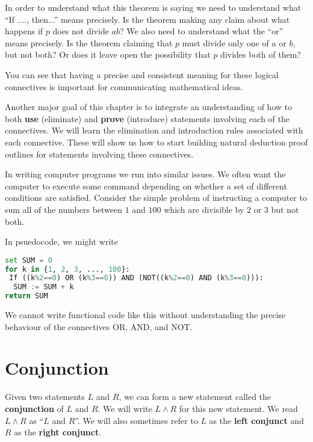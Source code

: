 In order to understand what this theorem is saying we need to understand what ``If ...., then...'' means precisely.  Is the theorem making any claim about what happens if $p$ does not divide $ab$?  We also need to understand what the ``or'' means precisely.  Is the theorem claiming that $p$ must divide only one of $a$ or $b$, but not both?  Or does it leave open the possibility that $p$ divides both of them?

You can see that having a precise and consistent meaning for these logical connectives is important for communicating mathematical ideas. 

Another major goal of this chapter is to integrate an understanding of how to both \textbf{use} (eliminate) and \textbf{prove} (introduce) statements involving each of the connectives.  We will learn the elimination and introduction rules associated with each connective.  These will show us how to start building natural deduction proof outlines for statements involving these connectives.

In writing computer programs we run into similar issues.  We often want the computer to execute some command depending on whether a set of different conditions are satisfied.  Consider the simple problem of instructing a computer to sum all of the numbers between $1$ and $100$ which are divisible by $2$ or $3$ but not both.

In psuedocode, we might write

\begin{lstlisting}[language=Python]
set SUM = 0
for k in {1, 2, 3, ..., 100}:
 If ((k%2==0) OR (k%3==0)) AND (NOT((k%2==0) AND (k%3==0))):
  SUM := SUM + k 
return SUM
\end{lstlisting}

We cannot write functional code like this without understanding the precise behaviour of the connectives OR, AND, and NOT.



\section{Conjunction}

Given two statements $L$ and $R$, we can form a new  statement called the \textbf{conjunction} of $L$ and $R$.  We will write $L \wedge R$ for this new statement.  We read $L \wedge R$ as ``$L$ and $R$''.  We will also sometimes refer to $L$ as the  \textbf{left conjunct} and $R$ as the \textbf{right conjunct}.

